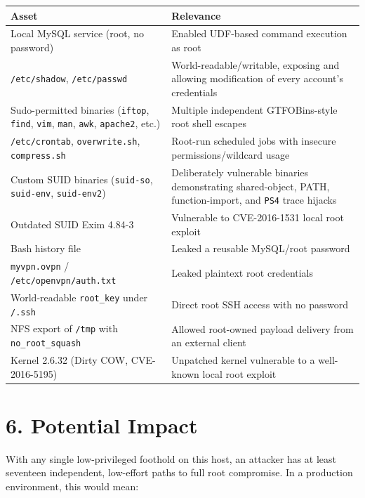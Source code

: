 \documentclass[11pt]{article}
\begin{document}
\begin{center}
\begin{tabular}{L{4.4cm}L{9.6cm}}
\toprule
\textbf{Asset} & \textbf{Relevance} \\
\midrule
Local MySQL service (root, no password) & Enabled UDF-based command execution as root \\
\texttt{/etc/shadow}, \texttt{/etc/passwd} & World-readable/writable, exposing and allowing modification of every account's credentials \\
Sudo-permitted binaries (\texttt{iftop}, \texttt{find}, \texttt{vim}, \texttt{man}, \texttt{awk}, \texttt{apache2}, etc.) & Multiple independent GTFOBins-style root shell escapes \\
\texttt{/etc/crontab}, \texttt{overwrite.sh}, \texttt{compress.sh} & Root-run scheduled jobs with insecure permissions/wildcard usage \\
Custom SUID binaries (\texttt{suid-so}, \texttt{suid-env}, \texttt{suid-env2}) & Deliberately vulnerable binaries demonstrating shared-object, PATH, function-import, and \texttt{PS4} trace hijacks \\
Outdated SUID Exim 4.84-3 & Vulnerable to CVE-2016-1531 local root exploit \\
Bash history file & Leaked a reusable MySQL/root password \\
\texttt{myvpn.ovpn} / \texttt{/etc/openvpn/auth.txt} & Leaked plaintext root credentials \\
World-readable \texttt{root\_key} under \texttt{/.ssh} & Direct root SSH access with no password \\
NFS export of \texttt{/tmp} with \texttt{no\_root\_squash} & Allowed root-owned payload delivery from an external client \\
Kernel 2.6.32 (Dirty COW, CVE-2016-5195) & Unpatched kernel vulnerable to a well-known local root exploit \\
\bottomrule
\end{tabular}
\end{center}

\section{6. Potential Impact}

With any single low-privileged foothold on this host, an attacker has at least seventeen
independent, low-effort paths to full root compromise. In a production environment, this would
mean:
\end{document}
